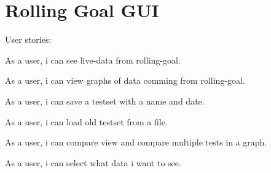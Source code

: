 \section{Rolling Goal GUI}

User stories:

As a user, i can see live-data from rolling-goal.

As a user, i can view graphs of data comming from rolling-goal.

As a user, i can save a testset with a name and date.

As a user, i can load old testset from a file.

As a user, i can compare view and compare multiple tests in a graph.

As a user, i can select what data i want to see.